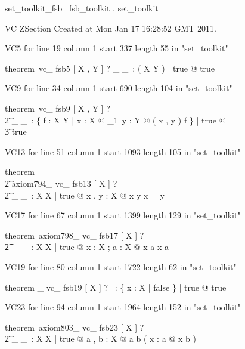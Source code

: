 \documentclass{article}
\begin{document}

\begin{zsection}
	 \SECTION set\_toolkit\_fsb \parents~fsb\_toolkit , set\_toolkit
\end{zsection}

VC ZSection Created at Mon Jan 17 16:28:52 GMT 2011.

VC5 for line 19 column 1 start 337 length 55 in "set_toolkit"
\begin{zed}
theorem~vc\_ fsb5 [ X , Y ] \vdash ? \exists \_ \rel \_~: \power \power ( X \cross Y ) | true @ true
\end{zed}

VC9 for line 34 column 1 start 690 length 104 in "set_toolkit"
\begin{zed}
theorem~vc\_ fsb9 [ X , Y ] \vdash ? \\
   \t2 \exists \_ \fun \_~: \power \{ f : X \rel Y | \forall x : X @ {\exists}_{1}~y : Y @ ( x , y ) \in f \} | true @ \\
    \t3 true
\end{zed}

VC13 for line 51 column 1 start 1093 length 105 in "set_toolkit"
\begin{zed}
theorem \\
   \t2 axiom794\_ vc\_ fsb13 [ X ] \vdash ? \\
   \t2 \exists \_ \neq \_~: X \rel X | true @ \forall x , y : X @ x \neq y \iff \lnot x = y
\end{zed}

VC17 for line 67 column 1 start 1399 length 129 in "set_toolkit"
\begin{zed}
theorem~axiom798\_ vc\_ fsb17 [ X ] \vdash ? \\
   \t2 \exists \_ \notin \_~: X \rel \power X | true @ \forall x : X ; a : \power X @ x \notin a \iff \lnot x \in a
\end{zed}

VC19 for line 80 column 1 start 1722 length 62 in "set_toolkit"
\begin{zed}
theorem \emptyset \_ vc\_ fsb19 [ X ] \vdash ? \exists \emptyset~: \power \{ x : X | false \} | true @ true
\end{zed}

VC23 for line 94 column 1 start 1964 length 152 in "set_toolkit"
\begin{zed}
theorem~axiom803\_ vc\_ fsb23 [ X ] \vdash ? \\
   \t2 \exists \_ \subseteq \_~: \power X \rel \power X | true @ \forall a , b : \power X @ a \subseteq b \iff ( \forall x : a @ x \in b )
\end{zed}
\end{document}
